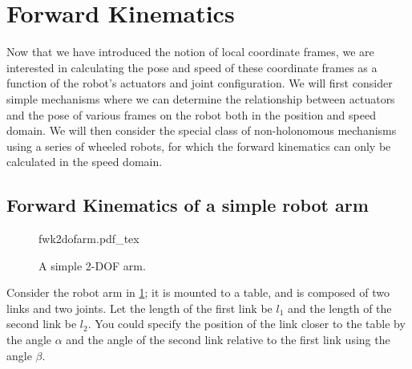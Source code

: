 \section{Forward Kinematics}\label{sec:kinematics:fwkarm}

Now that we have introduced the notion of local coordinate frames, we are interested in calculating the pose and speed of these coordinate frames as a function of the robot's actuators and joint configuration.
We will first consider simple mechanisms where we can determine the relationship between actuators and the pose of various frames on the robot both in the position and speed domain. We will then consider the special class of non-holonomous mechanisms using a series of wheeled robots, for which the forward kinematics can only be calculated in the speed domain.

\subsection{Forward Kinematics of a simple robot arm}

\begin{figure}[!htb]%
    \centering
    \def\svgwidth{0.4\textwidth}
    {fwk2dofarm.pdf_tex}
    \caption{A simple 2-DOF arm.}\label{fig:fwk2dofarm}
\end{figure}

Consider the robot arm in \cref{fig:fwk2dofarm}; it is mounted to a table, and is composed of two links and two joints. Let the length of the first link be $l_1$ and the length of the second link be $l_2$. You could specify the position of the link closer to the table by the angle $\alpha$ and the angle of the second link relative to the first link using the angle $\beta$.

